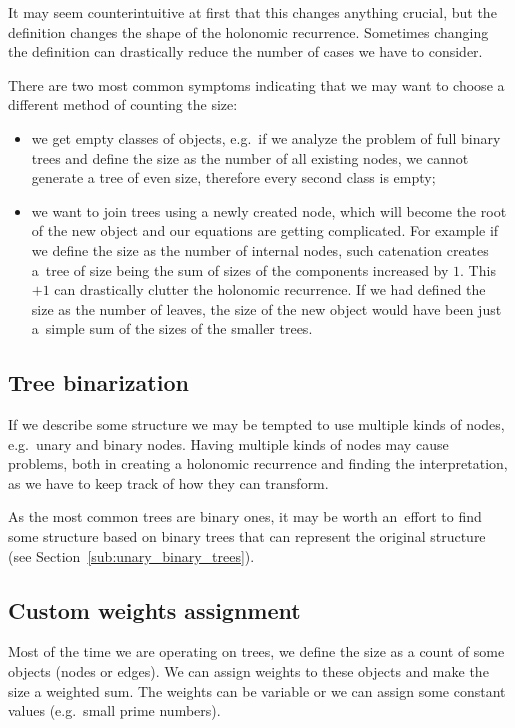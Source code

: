 \documentclass[final]{article}
\theoremstyle{definition}
\theoremstyle{definition}
\theoremstyle{remark}
\begin{document}
It may seem counterintuitive at first that this changes anything crucial, but the definition changes the shape of the holonomic recurrence. Sometimes changing the definition can drastically reduce the number of cases we have to consider.

There are two most common symptoms indicating that we may want to choose a different method of counting the size:
\begin{itemize}
    \item we get empty classes of objects, e.g.~if we analyze the problem of full binary trees and define the size as the number of all existing nodes, we cannot generate a tree of even size, therefore every second class is empty;
    \item we want to join trees using a newly created node, which will become the root of the new object and our equations are getting complicated. For example if we define the size as the number of internal nodes, such catenation creates a~tree of size being the sum of sizes of the components increased by \(1\). This \(+1\) can drastically clutter the holonomic recurrence. If we had defined the size as the number of leaves, the size of the new object would have been just a~simple sum of the sizes of the smaller trees.
\end{itemize}

\subsection{Tree binarization}%
\label{sub:tree_binarization}

If we describe some structure we may be tempted to use multiple kinds of nodes, e.g.~unary and binary nodes. Having multiple kinds of nodes may cause problems, both in creating a holonomic recurrence and finding the interpretation, as we have to keep track of how they can transform.

As the most common trees are binary ones, it may be worth an~effort to find some structure based on binary trees that can represent the original structure (see Section~\ref{sub:unary_binary_trees}).

\subsection{Custom weights assignment}%
\label{sub:weights_variablization}

Most of the time we are operating on trees, we define the size as a count of some objects (nodes or edges). We can assign weights to these objects and make the size a weighted sum. The weights can be variable or we can assign some constant values (e.g.~small prime numbers).
\end{document}
